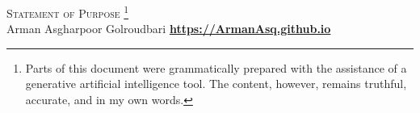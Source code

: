 \documentclass[a4,20pt]{article}
\def\Vrulefill#1#2{
    \vspace{-10pt}
    \leavevmode%
    \leaders%
    \vtop{\hsize=.0025in\vskip#1#2}%
    \hfill%
    \vspace{-2pt}
}
\begin{document}
{{\huge \scshape Statement of Purpose }} \footnote{Parts of this document were grammatically prepared with the assistance of a generative artificial intelligence tool. The content, however, remains truthful, accurate, and in my own words.}
\\
\large{Arman Asgharpoor Golroudbari} \hfill 
\href{https://ArmanAsq.github.io}{\textbf{\small{https://ArmanAsq.github.io}}} \\ %
\Vrulefill{-.05in}{-}
\justifying
\end{document}
